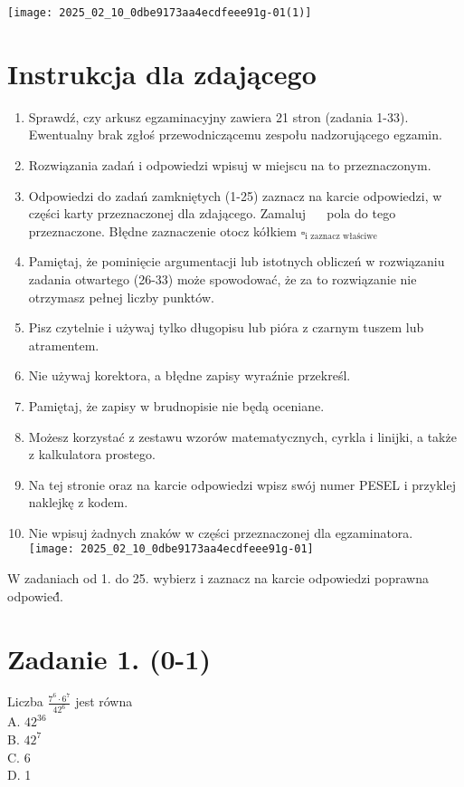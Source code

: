 \documentclass[10pt]{article}
\author{DATA: 3 czerwca 2016 r.\\
Godzina rozpoczęcia: 9:00\\
CZAS PRACY: 170 minut\\
LicZba punktów do uzyskania: 50}
\date{}
\begin{document}
\maketitle
\begin{center}
\texttt{[image: 2025\_02\_10\_0dbe9173aa4ecdfeee91g-01(1)]}
\end{center}



\section*{Instrukcja dla zdającego}
\begin{enumerate}
  \item Sprawdź, czy arkusz egzaminacyjny zawiera 21 stron (zadania 1-33). Ewentualny brak zgłoś przewodniczącemu zespołu nadzorującego egzamin.
  \item Rozwiązania zadań i odpowiedzi wpisuj w miejscu na to przeznaczonym.
  \item Odpowiedzi do zadań zamkniętych (1-25) zaznacz na karcie odpowiedzi, w części karty przeznaczonej dla zdającego. Zamaluj \(\quad\) pola do tego przeznaczone. Błędne zaznaczenie otocz kółkiem \(\square_{\text {i zaznacz właściwe }}\)
  \item Pamiętaj, że pominięcie argumentacji lub istotnych obliczeń w rozwiązaniu zadania otwartego (26-33) może spowodować, że za to rozwiązanie nie otrzymasz pełnej liczby punktów.
  \item Pisz czytelnie i używaj tylko długopisu lub pióra z czarnym tuszem lub atramentem.
  \item Nie używaj korektora, a błędne zapisy wyraźnie przekreśl.
  \item Pamiętaj, że zapisy w brudnopisie nie będą oceniane.
  \item Możesz korzystać z zestawu wzorów matematycznych, cyrkla i linijki, a także z kalkulatora prostego.
  \item Na tej stronie oraz na karcie odpowiedzi wpisz swój numer PESEL i przyklej naklejkę z kodem.
  \item Nie wpisuj żadnych znaków w części przeznaczonej dla egzaminatora.\\
\texttt{[image: 2025\_02\_10\_0dbe9173aa4ecdfeee91g-01]}
\end{enumerate}

W zadaniach od 1. do 25. wybierz i zaznacz na karcie odpowiedzi poprawna odpowied́́.

\section*{Zadanie 1. (0-1)}
Liczba \(\frac{7^{6} \cdot 6^{7}}{42^{6}}\) jest równa\\
A. \(42^{36}\)\\
B. \(42^{7}\)\\
C. 6\\
D. 1
\end{document}
